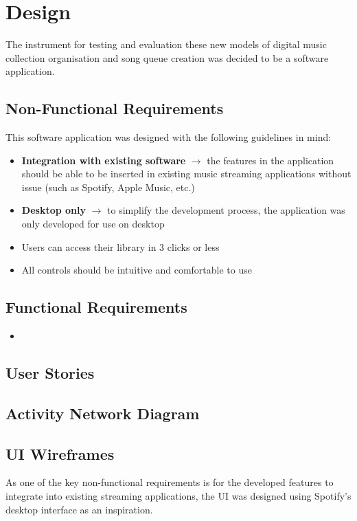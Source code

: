\chapter{Design}

The instrument for testing and evaluation these new models of digital music collection organisation and song queue creation was decided to be a software application.

\section{Non-Functional Requirements}
This software application was designed with the following guidelines in mind:\begin{itemize}
    \item \textbf{
        Integration with existing software
    } \(\to\) the features in the application should be able to be inserted in existing music streaming applications without issue (such as Spotify, Apple Music, etc.) %
    \item \textbf{
        Desktop only
    } \(\to\) to simplify the development process, the application was only developed for use on desktop
    \item Users can access their library in 3 clicks or less %
    \item All controls should be intuitive and comfortable to use
\end{itemize} %

\section{Functional Requirements}
\begin{itemize}
    \item 
\end{itemize}

\section{User Stories}

\section{Activity Network Diagram} %

\section{UI Wireframes}%
As one of the key non-functional requirements is for the developed features to integrate into existing streaming applications, the UI was designed using Spotify's desktop interface as an inspiration.